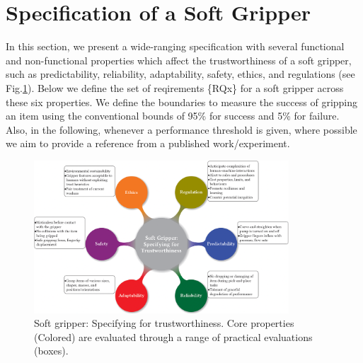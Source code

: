 \documentclass[lettersize,journal]{IEEEtran}
\begin{document}
\section{Specification of a Soft Gripper}\label{specification-gripper}
In this section, we present a wide-ranging specification with several functional and non-functional properties which affect the trustworthiness of a soft gripper, such as predictability, reliability, adaptability, safety, ethics, and regulations (see Fig.\ref{SR-spec}). Below we define the set of reqirements \{RQx\} for a soft gripper across these six properties.
We define the boundaries to measure the success of gripping an item using the conventional bounds of 95\% for success and 5\% for failure. 
Also, in the following, whenever a performance threshold is given, where possible we aim to provide a reference from a published work/experiment. 
\begin{figure}
	\centering
	\includegraphics[width=0.85\textwidth]{figures/soft-t.png}
	\caption{Soft gripper: Specifying for trustworthiness. Core properties (Colored) are evaluated through a range of practical evaluations (boxes). }
	\label{SR-spec}
\end{figure}
\end{document}
